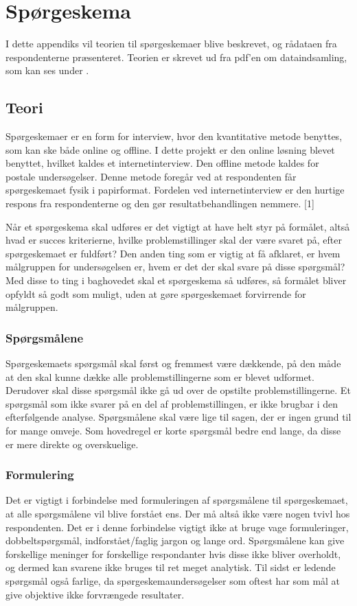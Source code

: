 \chapter{Spørgeskema}
I dette appendiks vil teorien til spørgeskemaer blive beskrevet, og rådataen fra respondenterne præsenteret. Teorien er skrevet ud fra pdf'en om dataindsamling, som kan ses under \citep{metodeogprojektskrivning}.
\section{Teori}
Spørgeskemaer er en form for interview, hvor den kvantitative metode benyttes, som kan ske både online og offline. I dette projekt er den online løsning blevet benyttet, hvilket kaldes et internetinterview. Den offline metode kaldes for postale undersøgelser. Denne metode foregår ved at respondenten får spørgeskemaet fysik i papirformat. Fordelen ved internetinterview er den hurtige respons fra respondenterne og den gør resultatbehandlingen nemmere. [1]\newline

Når et spørgeskema skal udføres er det vigtigt at have helt styr på formålet, altså hvad er succes kriterierne, hvilke problemstillinger skal der være svaret på, efter spørgeskemaet er fuldført? Den anden ting som er vigtig at få afklaret, er hvem målgruppen for undersøgelsen er, hvem er det der skal svare på disse spørgsmål? Med disse to ting i baghovedet skal et spørgeskema så udføres, så formålet bliver opfyldt så godt som muligt, uden at gøre spørgeskemaet forvirrende for målgruppen.

\subsection{Spørgsmålene}
Spørgeskemaets spørgsmål skal først og fremmest være dækkende, på den måde at den skal kunne dække alle problemstillingerne som er blevet udformet. Derudover skal disse spørgsmål ikke gå ud over de opstilte problemstillingerne. Et spørgsmål som ikke svarer på en del af problemstillingen, er ikke brugbar i den efterfølgende analyse. Spørgsmålene skal være lige til sagen, der er ingen grund til for mange omveje. Som hovedregel er korte spørgsmål bedre end lange, da disse er mere direkte og overskuelige. 
\subsection{Formulering}
Det er vigtigt i forbindelse med formuleringen af spørgsmålene til spørgeskemaet, at alle spørgsmålene vil blive forstået ens. Der må altså ikke være nogen tvivl hos respondenten. Det er i denne forbindelse vigtigt ikke at bruge vage formuleringer, dobbeltspørgsmål, indforstået/faglig jargon og lange ord. Spørgsmålene kan give forskellige meninger for forskellige respondanter hvis disse ikke bliver overholdt, og dermed kan svarene ikke bruges til ret meget analytisk.
Til sidst er ledende spørgsmål også farlige, da spørgeskemaundersøgelser som oftest har som mål at give objektive ikke forvrængede resultater.


